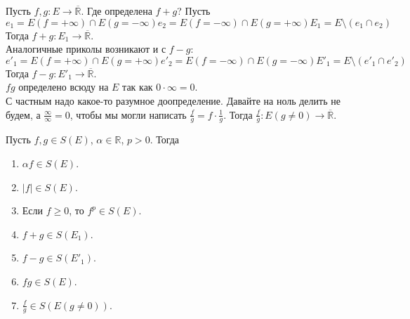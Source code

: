 \documentclass{article}
\begin{document}
    \begin{remark}
        Пусть $f,g\colon E\to\overline{\mathbb R}$. Где определена $f+g$? Пусть
        $$
        e_1=E(f=+\infty)\cap E(g=-\infty)
        e_2=E(f=-\infty)\cap E(g=+\infty)
        E_1=E\setminus(e_1\cap e_2)
        $$
        Тогда $f+g\colon E_1\to\overline{\mathbb R}$.\\
        Аналогичные приколы возникают и с $f-g$:
        $$
        e'_1=E(f=+\infty)\cap E(g=+\infty)
        e'_2=E(f=-\infty)\cap E(g=-\infty)
        E'_1=E\setminus(e'_1\cap e'_2)
        $$
        Тогда $f-g\colon E'_1\to\overline{\mathbb R}$.\\
        $fg$ определено всюду на $E$ так как $0\cdot\infty=0$.\\
        С частным надо какое-то разумное доопределение. Давайте на ноль делить не будем, а $\frac\infty\infty=0$, чтобы мы могли написать $\frac fg=f\cdot\frac1g$. Тогда $\frac fg\colon E(g\neq0)\to\overline{\mathbb R}$.
    \end{remark}
    \begin{theorem}
        Пусть $f,g\in S(E)$, $\alpha\in\mathbb R$, $p>0$. Тогда
        \begin{enumerate}
            \item $\alpha f\in S(E)$.
            \item $|f|\in S(E)$.
            \item Если $f\geqslant 0$, то $f^p\in S(E)$.
            \item $f+g\in S(E_1)$.
            \item $f-g\in S(E'_1)$.
            \item $fg\in S(E)$.
            \item $\frac fg\in S(E(g\neq0))$.
        \end{enumerate}
    \end{theorem}
\end{document}
